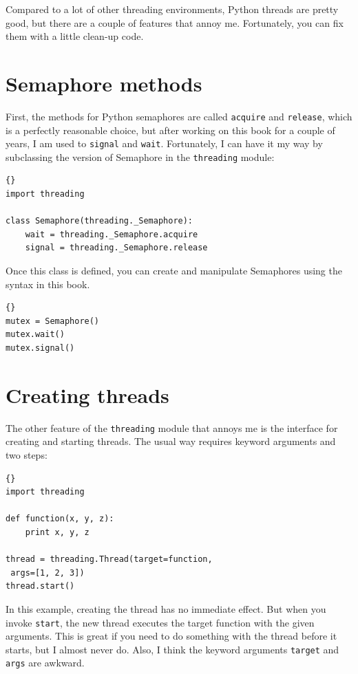 \documentclass{book}
\begin{document}
Compared to a lot of other threading environments, Python threads are
pretty good, but there are a couple of features that annoy me.
Fortunately, you can fix them with a little clean-up code.

\section{Semaphore methods}

First, the methods for Python semaphores are called {\tt acquire}
and {\tt release}, which is a perfectly reasonable choice, but
after working on this book for a couple of years, I am used
to {\tt signal} and {\tt wait}.  Fortunately, I can have it
my way by subclassing the version of Semaphore in the
    {\tt threading} module:

\begin{lstlisting}[title={Semaphore name change}]{}
import threading
 
class Semaphore(threading._Semaphore):
    wait = threading._Semaphore.acquire
    signal = threading._Semaphore.release
\end{lstlisting}

Once this class is defined, you can create and manipulate Semaphores
using the syntax in this book.

\begin{lstlisting}[title={Semaphore example}]{}
mutex = Semaphore()
mutex.wait()
mutex.signal()
\end{lstlisting}

\section{Creating threads}

The other feature of the {\tt threading} module that annoys
me is the interface for creating and starting threads.  The
usual way requires keyword arguments and two steps:

\begin{lstlisting}[title={Thread example (standard way)}]{}
import threading

def function(x, y, z):
    print x, y, z

thread = threading.Thread(target=function, 
 args=[1, 2, 3])
thread.start()
\end{lstlisting}

In this example, creating the thread has no immediate effect.
But when you invoke {\tt start}, the new thread executes
the target function with the given arguments.
This is great if you need to do something with the thread
before it starts, but I almost never do.
Also, I think the keyword arguments {\tt target} and {\tt args}
are awkward.
\end{document}
